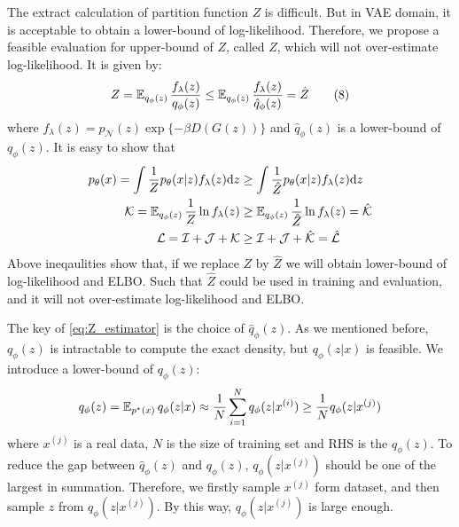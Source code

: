 The extract calculation of partition function $Z$ is difficult. But in VAE domain, it is acceptable to obtain a lower-bound of log-likelihood. Therefore, we propose a feasible evaluation for upper-bound of $Z$, called $\hat{Z}$, which will not over-estimate log-likelihood. 
It is given by:
\begin{align*}\label{eq:Z_estimator}
	Z = \operatorname{\mathbb{E}}_{q_\phi(z)}\frac{f_\lambda(z)}{q_\phi(z)} \leq \operatorname{\mathbb{E}}_{q_\phi(z)} \frac{f_\lambda(z)}{\hat{q}_\phi(z)} = \hat{Z} \tag{8}
\end{align*}
where $f_\lambda(z) = p_\mathcal{N}(z) \exp\{- \beta D(G(z))\}$ and $\hat{q}_\phi(z)$ is a lower-bound of $q_\phi(z)$. It is easy to show that
\begin{align*}
	p_\theta(x) = \int \frac{1}{Z} p_\theta(x|z) f_\lambda(z) \mathrm{d} z &\geq \int \frac{1}{\hat{Z}} p_\theta(x|z) f_\lambda(z) \mathrm{d} z \\
\mathcal{K} = \operatorname{\mathbb{E}}_{q_\phi(z)} \frac{1}{Z} \ln f_\lambda(z) &\geq \operatorname{\mathbb{E}}_{q_\phi(z)} \frac{1}{\hat{Z}}\ln f_\lambda(z) = \mathcal{\hat{K}} \\
\mathcal{L} = \mathcal{I} + \mathcal{J} + \mathcal{K} &\geq \mathcal{I} + \mathcal{J} + \mathcal{\hat{K}} = \mathcal{\hat{L}}
\end{align*}
Above ineqaulities show that, if we replace $Z$ by $\hat{Z}$ we will obtain lower-bound of log-likelihood and ELBO. Such that $\hat{Z}$ could be used in training and evaluation, and it will not over-estimate log-likelihood and ELBO. 

The key of \cref{eq:Z_estimator} is the choice of $\hat{q}_\phi(z)$. As we mentioned before, $q_\phi(z)$ is intractable to compute the exact density, but $q_\phi(z|x)$ is feasible. We introduce a lower-bound of  $q_\phi(z)$:
\begin{equation*}
	q_\phi(z) = \operatorname{\mathbb{E}}_{p^*(x)} q_\phi(z|x) \approx \frac{1}{N}\sum_{i=1}^N q_\phi(z|x^{(i)}) \geq \frac{1}{N} q_\phi(z|x^{(j)})
\end{equation*}
where $x^{(j)}$ is a real data, $N$ is the size of training set and RHS is the $\hat{q}_\phi(z)$. To reduce the gap between $\hat{q}_\phi(z)$ and $q_\phi(z)$, $q_\phi(z|x^{(j)})$ should be one of the largest in summation. Therefore, we firstly sample $x^{(j)}$ form dataset, and then sample $z$ from $q_\phi(z|x^{(j)})$. By this way, $q_\phi(z|x^{(j)})$ is  large enough. 

